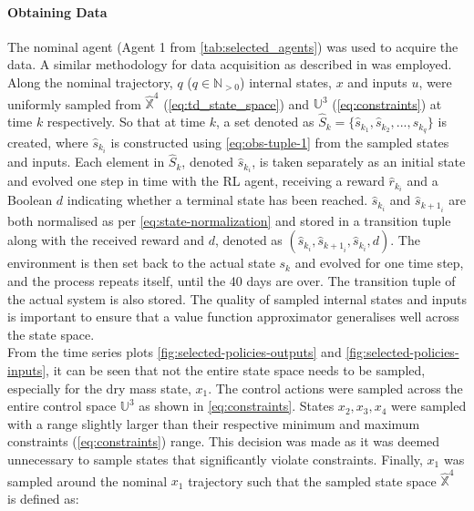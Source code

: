 \paragraph{Obtaining Data}
The nominal agent (Agent 1 from \autoref{tab:selected_agents}) was used to acquire the data. A similar methodology for data acquisition as described in \citet{linReinforcementLearningBasedModel2023} was employed. Along the nominal trajectory, $q$ ($q \in \mathbb{N}_{>0}$) internal states, $x$ and inputs $u$, were uniformly sampled from $\hat{\mathbb{X}}^4$ (\autoref{eq:td_state_space}) and ${\mathbb{U}}^3$ (\autoref{eq:constraints}) at time $k$ respectively. So that at time $k$, a set denoted as $\hat{S}_{k} = \{\hat{s}_{k_1},\hat{s}_{k_2},...,\hat{s}_{k_q}\}$ is created, where $\hat{s}_{k_i}$ is constructed using \autoref{eq:obs-tuple-1} from the sampled states and inputs. Each element in $\hat{S}_k$, denoted $\hat{s}_{k_i}$, is taken separately as an initial state and evolved one step in time with the RL agent, receiving a reward $\hat{r}_{k_i}$ and a Boolean $d$ indicating whether a terminal state has been reached. $\hat{s}_{k_i}$ and $\hat{s}_{{k+1}_i}$ are both normalised as per \autoref{eq:state-normalization} and stored in a transition tuple along with the received reward and $d$, denoted as $(\hat{s}_{k_i},\hat{s}_{{k+1}_i},\hat{s}_{k_i},d)$. The environment is then set back to the actual state $s_k$ and evolved for one time step, and the process repeats itself, until the 40 days are over. The transition tuple of the actual system is also stored. The quality of sampled internal states and inputs is important to ensure that a value function approximator generalises well across the state space. \\
From the time series plots \autoref{fig:selected-policies-outputs} and \autoref{fig:selected-policies-inputs}, it can be seen that not the entire state space needs to be sampled, especially for the dry mass state, $x_1$. The control actions were sampled across the entire control space $\mathbb{U}^3$ as shown in \autoref{eq:constraints}. States $x_2,x_3,x_4$ were sampled with a range slightly larger than their respective minimum and maximum constraints (\autoref{eq:constraints}) range. This decision was made as it was deemed unnecessary to sample states that significantly violate constraints. Finally, $x_1$ was sampled around the nominal $x_1$ trajectory such that the sampled state space $\hat{\mathbb{X}}^4$ is defined as:



